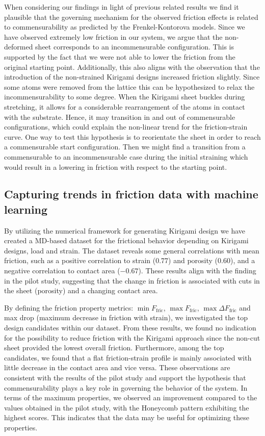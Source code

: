 When considering our findings in light of previous related results we find it
plausible that the governing mechanism for the observed friction effects is
related to commensurability as predicted by the Frenkel-Kontorova models. Since we have observed extremely low friction in
our system, we argue that the non-deformed sheet corresponds to an
incommensurable configuration. This is supported by the fact that we were not
able to lower the friction from the original starting point. Additionally, this
also aligns with the observation that the introduction of the non-strained
Kirigami designs increased friction slightly. Since some atoms were removed from
the lattice this can be hypothesized to relax the incommensurability to some
degree. When the Kirigami sheet buckles during stretching, it allows for a
considerable rearrangement of the atoms in contact with the substrate. Hence, it
may transition in and out of commensurable configurations, which could explain
the non-linear trend for the friction-strain curve. One way to test this
hypothesis is to reorientate the sheet in order to reach a commensurable start
configuration. Then we might find a transition from a commensurable to an
incommensurable case during the initial straining which would result in a
lowering in friction with respect to the starting point. 



\subsection{Capturing trends in friction data with machine learning}
By utilizing the numerical framework for generating Kirigami design we have
created a \acrshort{MD}-based dataset for the frictional behavior depending on
Kirigami designs, load and strain. The dataset reveals some general correlations
with mean friction, such as a positive correlation to strain (0.77) and porosity
(0.60), and a negative correlation to contact area ($-0.67$). These results
align with the finding in the pilot study, suggesting that the change in
friction is associated with cuts in the sheet (porosity) and a changing contact
area. 

By defining the friction property metrics: $\min F_{\text{fric}}$, $\max
F_{\text{fric}}$, $\max \Delta F_{\text{fric}}$ and max drop (maximum decrease
in friction with strain), we investigated the top design candidates within our
dataset. From these results, we found no indication for the possibility to
reduce friction with the Kirigami approach since the non-cut sheet provided the
lowest overall friction. Furthermore, among the top candidates, we found that a
flat friction-strain profile is mainly associated with little decrease in the
contact area and vice versa. These observations are consistent with the results
of the pilot study and support the hypothesis that commensurability plays a key
role in governing the behavior of the system. In terms of the maximum
properties, we observed an improvement compared to the values obtained in the
pilot study, with the Honeycomb pattern exhibiting the highest scores. This
indicates that the data may be useful for optimizing these properties. 

